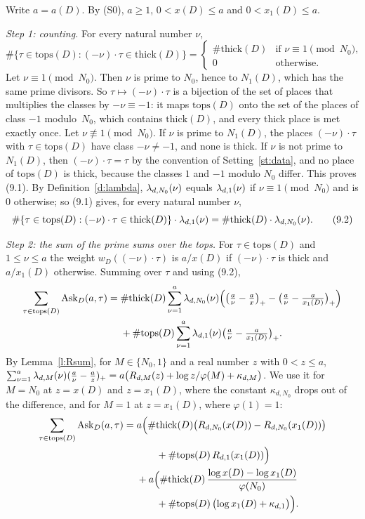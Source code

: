 \documentclass[11pt,a4paper]{article}
\makeatletter
\theoremstyle{plainx}
\theoremstyle{uprightx}
\renewenvironment{proof}[1][Proof]{\par\pushQED{\qed}\normalfont\topsep0pt\partopsep0pt
  \trivlist\item[\hskip\labelsep\itshape #1.]\ignorespaces}{\popQED\endtrivlist\@endpefalse}
\newcommand{\kap}[2]{\kappa_{#1,#2}}
\newcommand{\scx}[1]{x(#1)}
\newcommand{\scxo}[1]{x_1(#1)}
\newcommand{\tops}[1]{\mathrm{tops}(#1)}
\newcommand{\thick}[1]{\mathrm{thick}(#1)}
\newcommand{\wD}[2]{w_{#1}(#2)}
\newcommand{\Ask}[3]{\mathrm{Ask}_{#1}(#2,#3)}
\makeatother
\begin{document}
\begin{proof}
Write $a=a(D)$. By (S0), $a\ge1$, $0<\scx{D}\le a$ and $0<\scxo{D}\le a$.

\emph{Step 1: counting.} For every natural number $\nu$,
\[
\#\{\tau\in\tops{D}:(-\nu)\cdot\tau\in\thick{D}\}=
\begin{cases}\#\thick{D}&\text{if }\nu\equiv1\pmod{N_0},\\ 0&\text{otherwise.}\end{cases}
\tag{9.1}
\]
Let $\nu\equiv1\pmod{N_0}$. Then $\nu$ is prime to $N_0$, hence to $N_1(D)$, which has the same prime divisors. So
$\tau\mapsto(-\nu)\cdot\tau$ is a bijection of the set of places that multiplies the classes by $-\nu\equiv-1$: it maps
$\tops{D}$ onto the set of the places of class $-1$ modulo~$N_0$, which contains $\thick{D}$, and every thick place
is met exactly once. Let $\nu\not\equiv1\pmod{N_0}$. If $\nu$ is prime to $N_1(D)$, the places $(-\nu)\cdot\tau$ with
$\tau\in\tops{D}$ have class $-\nu\ne-1$, and none is thick. If $\nu$ is not prime to $N_1(D)$, then
$(-\nu)\cdot\tau=\tau$ by the convention of Setting~\ref{st:data}, and no place of $\tops{D}$ is thick, because the
classes $1$ and $-1$ modulo $N_0$ differ. This proves (9.1). By Definition~\ref{d:lambda},
$\lambda_{d,N_0}(\nu)$ equals $\lambda_{d,1}(\nu)$ if $\nu\equiv1\pmod{N_0}$ and is $0$ otherwise; so (9.1)
gives, for every natural number $\nu$,
\[
\#\{\tau\in\tops{D}:(-\nu)\cdot\tau\in\thick{D}\}\cdot\lambdaClass{d}{1}{\nu}=\#\thick{D}\cdot\lambdaClass{d}{N_0}{\nu}.
\tag{9.2}
\]

\emph{Step 2: the sum of the prime sums over the tops.} For $\tau\in\tops{D}$ and $1\le\nu\le a$ the weight
$\wD{D}{(-\nu)\cdot\tau}$ is $a/\scx{D}$ if $(-\nu)\cdot\tau$ is thick and $a/\scxo{D}$ otherwise. Summing over $\tau$ and using
(9.2),
\begin{align*}
\sum_{\tau\in\tops{D}}\Ask{D}{a}{\tau}
={}&\#\thick{D}\sum_{\nu=1}^{a}\lambdaClass{d}{N_0}{\nu}\Bigl(\bigl(\tfrac a\nu-\tfrac ax\bigr)_{+}-\bigl(\tfrac a\nu-\tfrac a{\scxo{D}}\bigr)_{+}\Bigr)\\
&+\#\tops{D}\sum_{\nu=1}^{a}\lambdaClass{d}{1}{\nu}\bigl(\tfrac a\nu-\tfrac a{\scxo{D}}\bigr)_{+}.
\end{align*}
By Lemma~\ref{l:Rsum}, for $M\in\{N_0,1\}$ and a real number $z$ with $0<z\le a$,
$\sum_{\nu=1}^{a}\lambdaClass{d}{M}{\nu}(\frac a\nu-\frac az)_{+}=a\bigl(\primeError{d}{M}{z}+\log z/\varphi(M)+\kap{d}{M}\bigr)$.
We use it for $M=N_0$ at $z=\scx{D}$ and $z=\scxo{D}$, where the constant $\kap{d}{N_0}$ drops out of the difference, and
for $M=1$ at $z=\scxo{D}$, where $\varphi(1)=1$:
\begin{align*}
\sum_{\tau\in\tops{D}}\Ask{D}{a}{\tau}
={}&a\Bigl(\#\thick{D}\bigl(\primeError{d}{N_0}{\scx{D}}-\primeError{d}{N_0}{\scxo{D}}\bigr)\\
&\qquad{}+\#\tops{D}\,\primeError{d}{1}{\scxo{D}}\Bigr)\\
&+a\Bigl(\#\thick{D}\,\frac{\log \scx{D}-\log \scxo{D}}{\varphi(N_0)}\\
&\qquad{}+\#\tops{D}\,\bigl(\log \scxo{D}+\kap{d}{1}\bigr)\Bigr).
\end{align*}


\end{proof}
\end{document}
